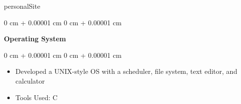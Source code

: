 personalSite\documentclass[10pt, letterpaper]{article}
\newenvironment{highlights}{
    \begin{itemize}[
        topsep=0.10 cm,
        parsep=0.10 cm,
        partopsep=0pt,
        itemsep=0pt,
        leftmargin=0 cm + 10pt
    ]
}{
    \end{itemize}
} %
\newenvironment{onecolentry}{
    \begin{adjustwidth}{
        0 cm + 0.00001 cm
    }{
        0 cm + 0.00001 cm
    }
}{
    \end{adjustwidth}
} %
\newenvironment{twocolentry}[2][]{
    \onecolentry
    \def\secondColumn{#2}
    \setcolumnwidth{\fill, 4.5 cm}
    \begin{paracol}{2}
}{
    \switchcolumn \raggedleft \secondColumn
    \end{paracol}
    \endonecolentry
} %
\begin{document}
        \vspace{0.2 cm}

        \begin{twocolentry}{
            2002
        }
            \textbf{Operating System}\end{twocolentry}

        \vspace{0.10 cm}
        \begin{onecolentry}
            \begin{highlights}
                \item Developed a UNIX-style OS with a scheduler, file system, text editor, and calculator
                \item Tools Used: C
            \end{highlights}
        \end{onecolentry}



    



        




    
   


    
\end{document}
